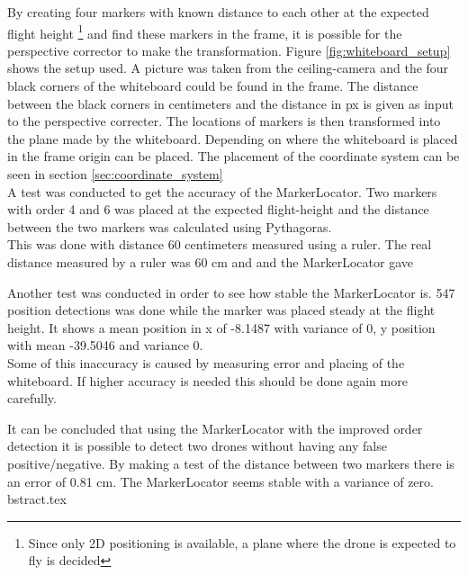 By creating four markers with known distance to each other at the expected flight height \footnote{Since only 2D positioning is available, a plane where the drone is expected to fly is decided} and find these markers in the frame, it is possible for the perspective corrector to make the transformation.
Figure \ref{fig:whiteboard_setup} shows the setup used. A picture was taken from the ceiling-camera and the four black corners of the whiteboard could be found in the frame. The distance between the black corners in centimeters and the distance in px is given as input to the perspective correcter. The locations of markers is then transformed into the plane made by the whiteboard. Depending on where the whiteboard is placed in the frame origin can be placed. The placement of the coordinate system can be seen in section \ref{sec:coordinate_system}\\


A test was conducted to get the accuracy of the MarkerLocator. Two markers with order 4 and 6 was placed at the expected flight-height and the distance between the two markers was calculated using Pythagoras.\\
This was done with distance 60 centimeters measured using a ruler. 
The real distance measured by a ruler was 60 cm and and the MarkerLocator gave 

Another test was conducted in order to see how stable the MarkerLocator is. 547 position detections was done while the marker was placed steady at the flight height. It shows a mean position in x of -8.1487 with variance of 0, y position with mean -39.5046 and variance 0. \\

Some of this inaccuracy is caused by measuring error and placing of the whiteboard. If higher accuracy is needed this should be done again more carefully.

It can be concluded that using the MarkerLocator with the improved order detection it is possible to detect two drones without having any false positive/negative. By making a test of the distance between two markers there is an error of 0.81 cm. The MarkerLocator seems stable with a variance of zero. 
bstract.tex

